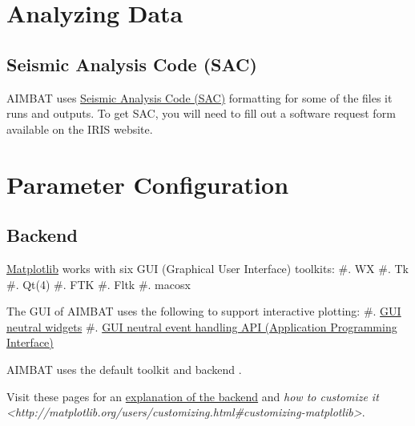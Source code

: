 \documentclass[letterpaper,10pt,english]{sphinxmanual}
\begin{document}
\chapter{Analyzing Data}
\label{docfiles/analyzingData:analyzing-data}\label{docfiles/analyzingData::doc}

\section{Seismic Analysis Code (SAC)}
\label{docfiles/analyzingData:seismic-analysis-code-sac}
AIMBAT uses \href{http://www.iris.edu/files/sac-manual/}{Seismic Analysis Code (SAC)} formatting for some of the files it runs and outputs. To get SAC, you will need to fill out a software request form available on the IRIS website.


\chapter{Parameter Configuration}
\label{docfiles/parameterConfiguration:parameter-configuration}\label{docfiles/parameterConfiguration::doc}

\section{Backend}
\label{docfiles/parameterConfiguration:backend}
\href{http://matplotlib.org/contents.html}{Matplotlib} works with six GUI (Graphical User Interface) toolkits:
\#. WX
\#. Tk
\#. Qt(4)
\#. FTK
\#. Fltk
\#. macosx

The GUI of AIMBAT uses the following to support interactive plotting:
\#. \href{http://matplotlib.org/api/widgets\_api.html}{GUI neutral widgets}
\#. \href{http://matplotlib.org/users/event\_handling.html}{GUI neutral event handling API (Application Programming Interface)}

AIMBAT uses the default toolkit  and backend .

Visit these pages for an \href{http://matplotlib.org/faq/usage\_faq.html\#what-is-a-backend}{explanation of the backend} and \emph{how to customize it \textless{}http://matplotlib.org/users/customizing.html\#customizing-matplotlib\textgreater{}}.
\end{document}
